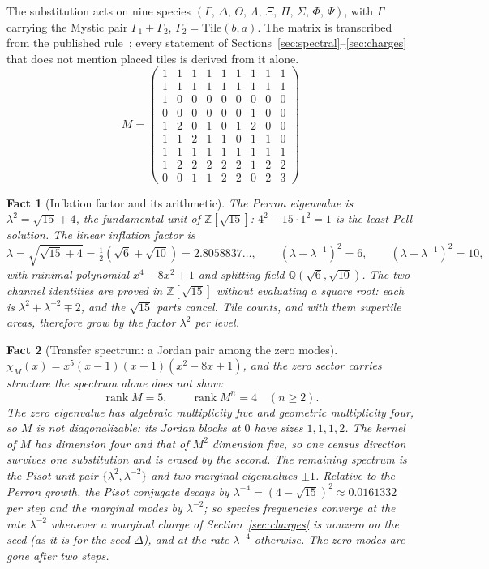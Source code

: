 \documentclass[11pt]{article}
\newtheorem{fact}{Fact}
\theoremstyle{definition}
\theoremstyle{remark}
\newcommand{\lam}{\lambda}
\begin{document}
The substitution acts on nine species $(\Gamma,\,\Delta,\,\Theta,\,\Lambda,\,\Xi,\,\Pi,\,\Sigma,\,\Phi,\,\Psi)$, with $\Gamma$ carrying the Mystic pair
$\Gamma_1+\Gamma_2$, $\Gamma_2=\mathrm{Tile}(b,a)$.  The matrix is transcribed from the
published rule~\cite{SmithEtAl2}; every statement of Sections~\ref{sec:spectral}--\ref{sec:charges} that does not
mention placed tiles is derived from it alone.
{\setlength{\arraycolsep}{2.6pt}
\begin{equation}
M=\begin{pmatrix}1&1&1&1&1&1&1&1&1 \\1&1&1&1&1&1&1&1&1 \\1&0&0&0&0&0&0&0&0 \\0&0&0&0&0&0&1&0&0 \\1&2&0&1&0&1&2&0&0 \\1&1&2&1&1&0&1&1&0 \\1&1&1&1&1&1&1&1&1 \\1&2&2&2&2&2&1&2&2 \\0&0&1&1&2&2&0&2&3\end{pmatrix}
\label{eq:M}
\end{equation}}

\begin{fact}[Inflation factor and its arithmetic]
\label{fact:lambda}
The Perron eigenvalue is $\lam^{2}=\sqrt{15} + 4$, the fundamental unit of
$\mathbb{Z}[\sqrt{15}]$: $4^{2}-15\cdot1^{2}=1$ is the least Pell solution.
The linear inflation factor is
\[
\lam=\sqrt{\sqrt{15} + 4}=\tfrac12(\sqrt6+\sqrt{10})=2.8058837\ldots,
\qquad
(\lam-\lam^{-1})^{2}=6,
\qquad
(\lam+\lam^{-1})^{2}=10,
\]
with minimal polynomial $x^{4} - 8 x^{2} + 1$ and splitting field $\mathbb{Q}(\sqrt6,\sqrt{10})$.
The two channel identities are proved in $\mathbb{Z}[\sqrt{15}]$ without
evaluating a square root: each is $\lam^{2}+\lam^{-2}\mp2$, and the
$\sqrt{15}$ parts cancel.  Tile counts, and with them supertile areas, therefore
grow by the factor $\lam^{2}$ per level.
\end{fact}

\begin{fact}[Transfer spectrum: a Jordan pair among the zero modes]
\label{fact:spectrum}
$\chi_M(x)=x^{5} (x - 1)(x + 1)(x^{2} - 8 x + 1)$, and the zero sector carries structure the spectrum alone does
not show:
\[
\operatorname{rank}M=5,\qquad \operatorname{rank}M^{n}=4\quad(n\ge2).
\]
The zero eigenvalue has algebraic multiplicity five and geometric multiplicity
four, so $M$ is not diagonalizable: its Jordan blocks at $0$ have sizes $1,1,1,2$.
The kernel of $M$ has dimension four and that of $M^{2}$ dimension five, so one
census direction survives one substitution and is erased by the second.  The
remaining spectrum is the Pisot-unit pair $\{\lam^{2},\lam^{-2}\}$ and two marginal
eigenvalues $\pm1$.
Relative to the Perron growth, the Pisot conjugate decays by $\lam^{-4}=(4 - \sqrt{15})^{2}\approx0.0161332$
per step and the marginal modes by $\lam^{-2}$; so species frequencies converge at the
rate $\lam^{-2}$ whenever a marginal charge of Section~\ref{sec:charges} is nonzero on the
seed (as it is for the seed $\Delta$), and at the rate $\lam^{-4}$ otherwise.  The zero
modes are gone after two steps.
\end{fact}
\end{document}
